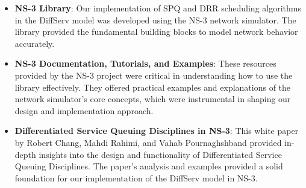 \documentclass{article}
\begin{document}
\begin{itemize}

    \item \textbf{NS-3 Library}: Our implementation of SPQ and DRR scheduling algorithms in the DiffServ model was developed using the NS-3 network simulator. The library provided the fundamental building blocks to model network behavior accurately.

    \item \textbf{NS-3 Documentation, Tutorials, and Examples}: These resources provided by the NS-3 project were critical in understanding how to use the library effectively. They offered practical examples and explanations of the network simulator's core concepts, which were instrumental in shaping our design and implementation approach.

    \item \textbf{Differentiated Service Queuing Disciplines in NS-3}: This white paper by Robert Chang, Mahdi Rahimi, and Vahab Pournaghshband provided in-depth insights into the design and functionality of Differentiated Service Queuing Disciplines. The paper's analysis and examples provided a solid foundation for our implementation of the DiffServ model in NS-3.

\end{itemize}
\end{document}
